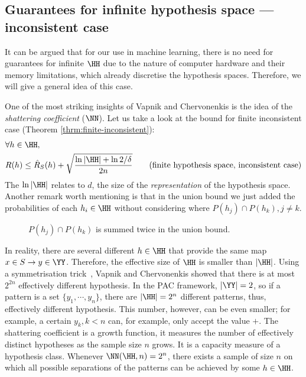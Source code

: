 \subsection{Guarantees for infinite hypothesis space --- inconsistent case} It can be argued that for our use in machine learning, there is no need for guarantees for infinite \(\HH\) due to the nature of computer hardware and their memory limitations, which already discretise the hypothesis spaces. Therefore, we will give a general idea of this case.

One of the most striking insights of Vapnik and Chervonenkis is the idea of the \emph{shattering coefficient} (\(\NN\)). Let us take a look at the bound for finite inconsistent case (Theorem \ref{thrm:finite-inconsistent}):
\begin{align}
	&\forall h \in \HH,\nonumber\\
	&R(h)\leq \hat{R}_{S}(h) + \sqrt{\frac{\ln{|\HH|}+ \ln{2/\delta}}{2n}} \tag{finite hypothesis space, inconsistent case}
\end{align}
The \(\ln |\HH|\) relates to \(d\), the size of the \emph{representation} of the hypothesis space. Another remark worth mentioning is that in the union bound we just added the probabilities of each \(h_i \in \HH\) without considering where \(P(h_j) \cap P(h_k), j \neq k\).
\begin{figure}
	[ht!] \centering
	\begin{venndiagram2sets}
		[tikzoptions={fill opacity=0.5},shade=blue!50!white, radius=0.8cm, labelA={\(h_j~~\)}, labelB={\(~~h_k\)}] \fillA \fillB
	\end{venndiagram2sets}
	\caption{\(P(h_j) \cap P(h_k)\) is summed twice in the union bound.}
\label{fig:join_probability} \end{figure}

In reality, there are several different \(h \in \HH\) that provide the same map \(x \in S \to y \in \YY\). Therefore, the effective size of \(\HH\) is smaller than \(|\HH|\). Using a symmetrisation trick~\cite[section 5.2] {luxburg:2011}, Vapnik and Chervonenkis showed that there is at most \(2^{2n}\) effectively different hypothesis. In the PAC framework, \(|\YY|=2\), so if a pattern is a set \(\{y_1,\cdots,y_n\}\), there are \(|\HH|=2^n\) different patterns, thus, effectively different hypothesis. This number, however, can be even smaller; for example, a certain \(y_k, k<n\) can, for example, only accept the value \({+}\). The shattering coefficient is a growth function, \ie it measures the number of effectively distinct hypotheses as the sample size \(n\) grows. It is a capacity measure of a hypothesis class. Whenever \(\NN(\HH, n)=2^n\), there exists a sample of size \(n\) on which all possible separations of the patterns can be achieved by some \(h \in \HH\).

